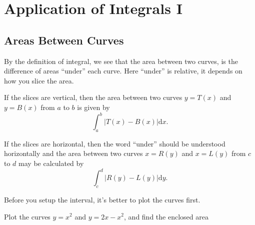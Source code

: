 \documentclass[
  en,11pt,simple]{elegantbook}
\renewenvironment{example}[1][]{
  \refstepcounter{exam}
  \par\noindent\textbf{\color{main}{\examplename} \theexam #1}
  \rmfamily
}{
  \par\ignorespacesafterend
}
\begin{document}
\hypertarget{application-of-integrals-i}{%
\chapter{Application of Integrals I}\label{application-of-integrals-i}}

\hypertarget{areas-between-curves}{%
\section{Areas Between Curves}\label{areas-between-curves}}

By the definition of integral, we see that the area between two curves, is the difference of areas ``under'' each curve. Here ``under'' is relative, it depends on how you slice the area.

If the slices are vertical, then the area between two curves \(y=T(x)\) and \(y=B(x)\) from \(a\) to \(b\) is given by
\[
\int_a^b|T(x)-B(x)|\mathrm{d} x.
\]

If the slices are horizontal, then the word ``under'' should be understood horizontally and the area between two curves \(x=R(y)\) and \(x=L(y)\) from \(c\) to \(d\) may be calculated by
\[
\int_c^d|R(y)-L(y)|\mathrm{d} y.
\]

Before you setup the interval, it's better to plot the curves first.

\begin{example}

Plot the curves \(y=x^2\) and \(y=2x-x^2\), and find the enclosed area
\end{example}
\end{document}
